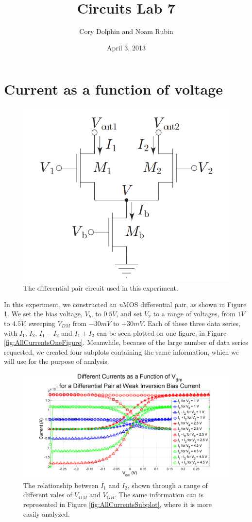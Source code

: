 \documentclass{article}
\title{Circuits Lab 7}
\author{Cory Dolphin and Noam Rubin}
\date{April 3, 2013}
\newcommand{\Vgb}{{$V_{GB}$}}
\newcommand{\Vb}{{$V_{b}$}}
\newcommand{\nMOS}{{\textit{n}MOS }}
\begin{document}
\maketitle

\section*{Current as a function of voltage}
\begin{figure}[H]
\centering
\includegraphics[width=0.65\linewidth]{./Figures/Schematic.png}
\caption{The differential pair circuit used in this experiment.}
\label{fig:Schematic}
\end{figure}

In this experiment, we constructed an \nMOS differential pair, as shown in Figure \ref{fig:Schematic}. We set the bias voltage, \Vb, to $0.5V$, and set $V_2$ to a range of voltages, from $1V$ to $4.5V$, sweeping $V_{DM}$ from $-30mV$ to $+30mV$. Each of these three data series, with $I_1$, $I_2$, $I_1 - I_2$ and $I_1 + I_2$ can be seen plotted on one figure, in Figure \ref{fig:AllCurrentsOneFigure}. Meanwhile, because of the large number of data series requested, we created four subplots containing the same information, which we will use for the purpose of analysis.
\begin{figure}[H]
\centering
\includegraphics[width=\linewidth]{./Figures/AllCurrentsOneFigure}
\caption{The relationship between $I_1$ and $I_2$, shown through a range of different vales of $V_{DM}$ and \Vgb. The same information can is represented in Figure \ref{fig:AllCurrentsSubplot}, where it is more easily analyzed. }
\label{fig:AllCurrentsOneFigure }
\end{figure}
\end{document}
